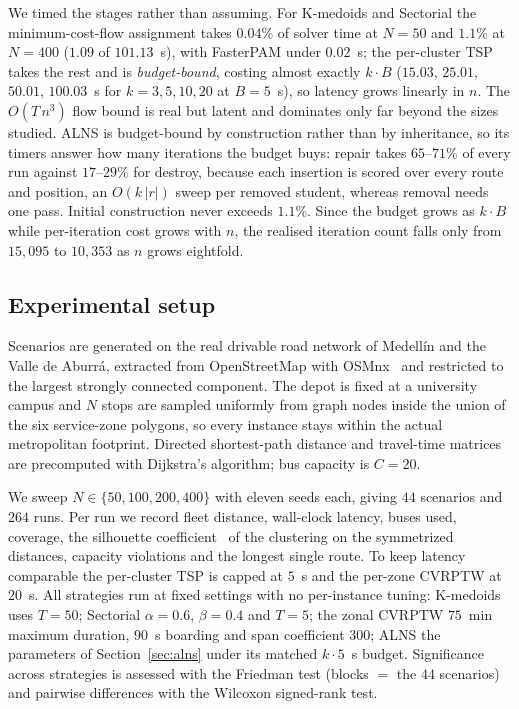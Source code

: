 \documentclass[graybox]{SNmult}
\begin{document}
We timed the stages rather than assuming. For K-medoids and Sectorial the
minimum-cost-flow assignment takes $0.04\%$ of solver time at $N=50$ and
$1.1\%$ at $N=400$ ($1.09$ of $101.13$~s), with FasterPAM under $0.02$~s;
the per-cluster TSP takes the rest and is \emph{budget-bound}, costing
almost exactly $k\cdot B$ ($15.03$, $25.01$, $50.01$, $100.03$~s for
$k=3,5,10,20$ at $B=5$~s), so latency grows linearly in $n$. The
$O(T\,n^3)$ flow bound is real but latent and dominates only far beyond
the sizes studied. ALNS is budget-bound by construction rather than by
inheritance, so its timers answer how many iterations the budget buys:
repair takes $65$--$71\%$ of every run against $17$--$29\%$ for destroy,
because each insertion is scored over every route and position, an
$O(k\,|r|)$ sweep per removed student, whereas removal needs one pass.
Initial construction never exceeds $1.1\%$. Since the budget grows as
$k\cdot B$ while per-iteration cost grows with $n$, the realised iteration
count falls only from $15{,}095$ to $10{,}353$ as $n$ grows eightfold.

\subsection{Experimental setup}\label{sec:setup}
Scenarios are generated on the real drivable road network of Medell\'in
and the Valle de Aburr\'a, extracted from OpenStreetMap with
OSMnx~\cite{Boeing2017OSMnx} and restricted to the largest strongly
connected component. The depot is fixed at a university campus and $N$
stops are sampled uniformly from graph nodes inside the union of the six
service-zone polygons, so every instance stays within the actual
metropolitan footprint. Directed shortest-path distance and travel-time
matrices are precomputed with Dijkstra's algorithm; bus capacity is
$C=20$.

We sweep $N\in\{50,100,200,400\}$ with eleven seeds each, giving $44$
scenarios and $264$ runs. Per run we record fleet distance, wall-clock
latency, buses used, coverage, the silhouette
coefficient~\cite{Rousseeuw1987Silhouettes} of the clustering on the
symmetrized distances, capacity violations and the longest single route.
To keep latency comparable the per-cluster TSP is capped at $5$~s and the
per-zone CVRPTW at $20$~s. All strategies run at fixed settings with no
per-instance tuning: K-medoids uses $T=50$; Sectorial $\alpha=0.6$,
$\beta=0.4$ and $T=5$; the zonal CVRPTW $75$~min maximum duration, $90$~s
boarding and span coefficient $300$; ALNS the parameters of
Section~\ref{sec:alns} under its matched $k\cdot5$~s budget. Significance
across strategies is assessed with the Friedman test (blocks $=$ the $44$
scenarios) and pairwise differences with the Wilcoxon signed-rank test.
\end{document}
